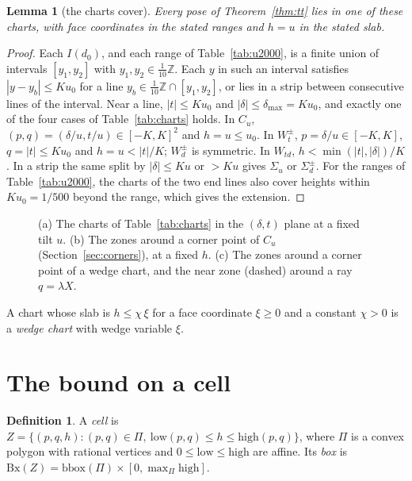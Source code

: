 \documentclass[11pt]{amsart}
\newtheorem{lemma}[theorem]{Lemma}
\theoremstyle{definition}
\newtheorem{definition}[theorem]{Definition}
\theoremstyle{remark}
\newcommand{\Z}{\mathbb Z}
\newcommand{\low}{\mathrm{low}}
\newcommand{\high}{\mathrm{high}}
\newcommand{\Bx}{\mathrm{Bx}}
\begin{document}
\begin{lemma}[the charts cover]\label{lem:charts}
Every pose of Theorem~\ref{thm:tt} lies in one of these charts, with face coordinates in the stated ranges and $h=u$
in the stated slab.
\end{lemma}

\begin{proof}
Each $I(d_0)$, and each range of Table~\ref{tab:u2000}, is a finite union of intervals $[y_1,y_2]$ with
$y_1,y_2\in\frac1{10}\Z$. Each $y$ in such an interval satisfies $|y-y_b|\le Ku_0$ for a line
$y_b\in\frac1{10}\Z\cap[y_1,y_2]$, or lies in a strip between consecutive lines of the interval. Near a line,
$|t|\le Ku_0$ and $|\delta|\le\delta_{\max}=Ku_0$, and exactly one of the four cases of Table~\ref{tab:charts} holds.
In $C_u$, $(p,q)=(\delta/u,t/u)\in[-K,K]^2$ and $h=u\le u_0$. In $W_t^\pm$, $p=\delta/u\in[-K,K]$,
$q=|t|\le Ku_0$ and $h=u<|t|/K$; $W_d^\pm$ is symmetric. In $W_{td}$, $h<\min(|t|,|\delta|)/K$. In a strip the same
split by $|\delta|\le Ku$ or $>Ku$ gives $\Sigma_u$ or $\Sigma_d^\pm$. For the ranges of Table~\ref{tab:u2000}, the
charts of the two end lines also cover heights within $Ku_0=1/500$ beyond the range, which gives the extension.
\end{proof}

\begin{figure}[ht]
\centering
\caption{(a) The charts of Table~\ref{tab:charts} in the $(\delta,t)$ plane at a fixed tilt $u$. (b) The zones around a
corner point of $C_u$ (Section~\ref{sec:corners}), at a fixed $h$. (c) The zones around a corner point of a wedge chart,
and the near zone (dashed) around a ray $q=\lambda X$.}
\label{fig:zones}
\end{figure}

A chart whose slab is $h\le\chi\,\xi$ for a face coordinate $\xi\ge0$ and a constant $\chi>0$ is a \emph{wedge chart}
with wedge variable $\xi$.

\section{The bound on a cell}\label{sec:cell}

\begin{definition}
A \emph{cell} is $Z=\{(p,q,h):(p,q)\in\Pi,\ \low(p,q)\le h\le\high(p,q)\}$, where $\Pi$ is a convex polygon with
rational vertices and $0\le\low\le\high$ are affine. Its \emph{box} is $\Bx(Z)=\mathrm{bbox}(\Pi)\times[0,\max_\Pi\high]$.
\end{definition}
\end{document}
